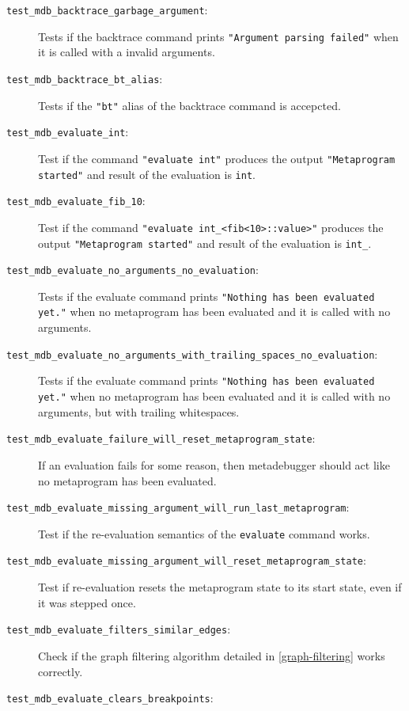 \begin{description}
    \item[\texttt{test\_mdb\_backtrace\_garbage\_argument}:]
        Tests if the backtrace command prints
        \texttt{"Argument parsing failed"} when it is called with a invalid
        arguments.
    \item[\texttt{test\_mdb\_backtrace\_bt\_alias}:]
        Tests if the \texttt{"bt"} alias of the backtrace command is
        accepcted.
    \item[\texttt{test\_mdb\_evaluate\_int}:]
        Test if the command \texttt{"evaluate int"} produces the output
        \texttt{"Metaprogram started"} and result of the evaluation is
        \texttt{int}.
    \item[\texttt{test\_mdb\_evaluate\_fib\_10}:]
        Test if the command \texttt{"evaluate int\_<fib<10>::value>"} produces
        the output \texttt{"Metaprogram started"} and result of the evaluation
        is \texttt{int\_<55>}.
    \item[\texttt{test\_mdb\_evaluate\_no\_arguments\_no\_evaluation}:]
        Tests if the evaluate command prints
        \texttt{"Nothing has been evaluated yet."} when no metaprogram has been
        evaluated and it is called with no arguments.
    \item[\texttt{test\_mdb\_evaluate\_no\_arguments\_with\_trailing\_spaces\_no\_evaluation}:]
        Tests if the evaluate command prints
        \texttt{"Nothing has been evaluated yet."} when no metaprogram has been
        evaluated and it is called with no arguments, but with trailing
        whitespaces.
    \item[\texttt{test\_mdb\_evaluate\_failure\_will\_reset\_metaprogram\_state}:]
        If an evaluation fails for some reason, then metadebugger should act
        like no metaprogram has been evaluated.
    \item[\texttt{test\_mdb\_evaluate\_missing\_argument\_will\_run\_last\_metaprogram}:]
        Test if the re-evaluation semantics of the \texttt{evaluate} command
        works.
    \item[\texttt{test\_mdb\_evaluate\_missing\_argument\_will\_reset\_metaprogram\_state}:]
        Test if re-evaluation resets the metaprogram state to its start state,
        even if it was stepped once.
    \item[\texttt{test\_mdb\_evaluate\_filters\_similar\_edges}:]
        Check if the graph filtering algorithm detailed in
        \ref{graph-filtering} works correctly.
    \item[\texttt{test\_mdb\_evaluate\_clears\_breakpoints}:]

\end{description}
